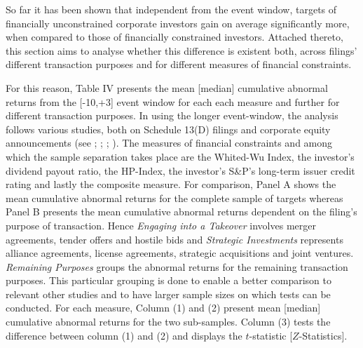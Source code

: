 \documentclass[12pt]{article}
\begin{document}
\noindent So far it has been shown that independent from the event window, targets of financially unconstrained corporate investors gain on average significantly more, when compared to those of financially constrained investors. Attached thereto, this section aims to analyse whether this difference is existent both, across filings' different transaction purposes and for different measures of financial constraints.\par
For this reason, Table IV presents the mean [median] cumulative abnormal returns from the [-10,+3] event window for each each measure and further for different transaction purposes. In using the longer event-window, the analysis follows various studies, both on Schedule 13(D) filings and corporate equity announcements (see \citet[p.369]{Greenwood2009}; \citet[p.210]{Klein2009}; \citet[p.1758]{Brav2008}; \citet[p.87]{Liao2014}). The measures of financial constraints and among which the sample separation takes place are the Whited-Wu Index, the investor's dividend payout ratio, the HP-Index, the investor's S\&P's long-term issuer credit rating and lastly the composite measure. For comparison, Panel A shows the mean cumulative abnormal returns for the complete sample of targets whereas Panel B presents the mean cumulative abnormal returns dependent on the filing's purpose of transaction. Hence \emph{Engaging into a Takeover} involves merger agreements, tender offers and hostile bids and \emph{Strategic Investments} represents alliance agreements, license agreements, strategic acquisitions and joint ventures. \emph{Remaining Purposes} groups the abnormal returns for the remaining transaction purposes. This particular grouping is done to enable a better comparison to relevant other studies and to have larger sample sizes on which tests can be conducted. For each measure, Column (1) and (2) present mean [median] cumulative abnormal returns for the two sub-samples. Column (3) tests the difference between column (1) and (2) and displays the  $t$-statistic [$Z$-Statistics].\par
\end{document}
